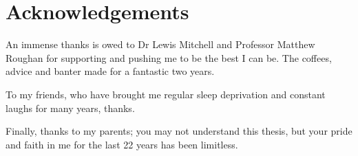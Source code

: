 \chapter{Acknowledgements}
\label{ch:acknowledgements}

An immense thanks is owed to Dr Lewis Mitchell and Professor Matthew Roughan for supporting and pushing me to be the best I can be. The coffees, advice and banter made for a fantastic two years.

To my friends, who have brought me regular sleep deprivation and constant laughs for many years, thanks.

Finally, thanks to my parents; you may not understand this thesis, but your pride and faith in me for the last 22 years has been limitless.

